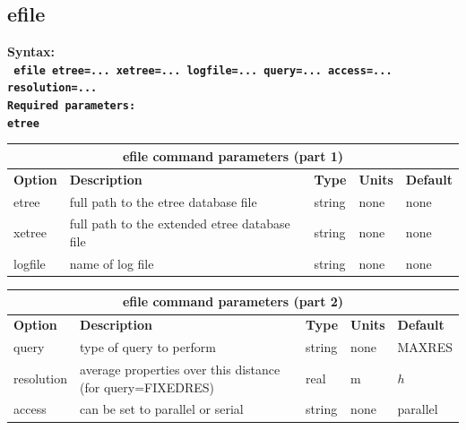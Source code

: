 \documentclass[11pt]{report}
\begin{document}
\subsection{efile}
\label{keyword:efile}
\begin{flushleft}
\bf
Syntax:\\
\tt
efile etree=... xetree=... logfile=... query=... access=... resolution=...\\
\bf 
Required parameters:\\
\tt etree
\end{flushleft}
\begin{center}
\begin{tabular}{|l|p{8cm}|l|l|l|} \hline
\multicolumn{5}{|c|}{\bf efile command parameters (part 1)}\\ \hline
\bf{Option} & \bf{Description}                                    & \bf{Type} & \bf{Units} & \bf{Default} \\ \hline 
\hline
etree      & full path to the etree database file                 & string   & none   & none \\ \hline
xetree     & full path to the extended etree database file        & string   & none   & none \\ \hline
logfile    & name of log file                                     & string   & none   & none \\ \hline
\end{tabular}
\end{center}
\begin{center}
\begin{tabular}{|l|p{8cm}|l|l|l|} \hline
\multicolumn{5}{|c|}{\bf efile command parameters (part 2)}\\ \hline
\bf{Option} & \bf{Description}                                & \bf{Type} & \bf{Units} & \bf{Default} \\ \hline 
\hline
query      & type of query to perform                         & string  & none   & MAXRES \\ \hline
resolution & average properties over this distance (for query=FIXEDRES) & real  & m      & $h$ \\ \hline
access     & can be set to parallel or serial                 & string  & none   &  parallel \\ \hline
\end{tabular}
\end{center}
\end{document}
